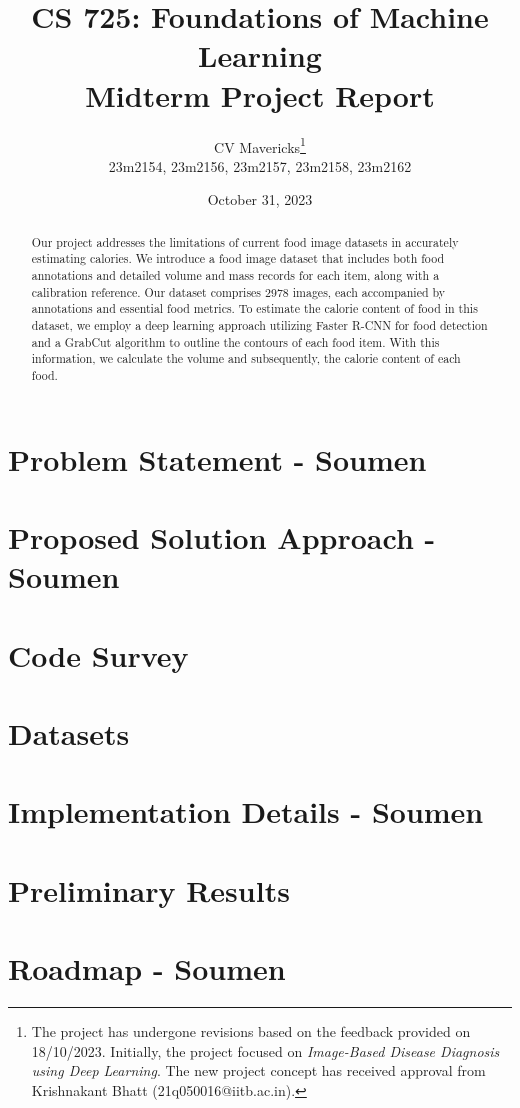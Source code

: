 \documentclass[12pt, a4paper, twoside]{article}
\title{\vspace{-0.5in}\textbf{CS 725: Foundations of Machine Learning \\
Midterm Project Report}}
\author{CV Mavericks\footnote{The project has undergone revisions based on the feedback provided on 18/10/2023. Initially, the project focused on \emph{Image-Based Disease Diagnosis using Deep Learning}. The new project concept has received approval from Krishnakant Bhatt (21q050016@iitb.ac.in).}\\
23m2154, 23m2156, 23m2157, 23m2158, 23m2162}
\date{October 31, 2023}
\begin{document}
\maketitle
\thispagestyle{fancy}

\begin{abstract}
Our project addresses the limitations of current food image datasets in accurately estimating calories. We introduce a food image dataset that includes both food annotations and detailed volume and mass records for each item, along with a calibration reference. Our dataset comprises 2978 images, each accompanied by annotations and essential food metrics. To estimate the calorie content of food in this dataset, we employ a deep learning approach utilizing Faster R-CNN for food detection and a GrabCut algorithm to outline the contours of each food item. With this information, we calculate the volume and subsequently, the calorie content of each food.
\end{abstract}

\section{Problem Statement - Soumen}
\lipsum[1]

\section{Proposed Solution Approach - Soumen}
\lipsum[2]

\section{Code Survey}
\lipsum[3]

\section{Datasets}
\lipsum[4]

\section{Implementation Details - Soumen}
\lipsum[5]

\section{Preliminary Results}
\lipsum[6]

\section{Roadmap - Soumen}
\lipsum[7]\cite{ang_ml}\cite{ddl_book}

\printbibliography
\end{document}

